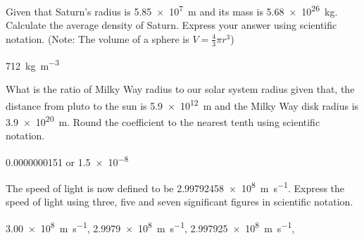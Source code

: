 \begin{question}[ID=SN13-Saturn,topic=units,difficulty=easy]
    Given that Saturn's radius is \SI{5.85e7}{\meter} and
        its mass is \SI{5.68e26}{\kilo\gram}.
    Calculate the average density of Saturn.
    Express your answer using scientific notation.
    (Note: The volume of a sphere is $V=\frac{4}{3} \pi{} r^3$)
\end{question}
\begin{solution}
    \SI{712}{\kilo\gram\per\meter\cubed}
\end{solution}


\begin{question}[ID=SN14-MilkyWay,topic=units,difficulty=easy]
    What is the ratio of Milky Way radius to our solar system radius given that,
        the distance from pluto to the sun is \SI{5.9e12}{\meter}
        and the Milky Way disk radius is \SI{3.9e20}{\meter}.
    Round the coefficient to the nearest tenth using scientific notation.
\end{question}
\begin{solution}
    \num{0.0000000151} or \num{1.5e-8}
\end{solution}


\begin{question}[ID=SN16-Light,topic=units,difficulty=easy]
    The speed of light is now defined to be
        \SI{2.99792458e8}{\meter\per\second}.
    Express the speed of light using three, five and seven
        significant figures in scientific notation.
\end{question}
\begin{solution}
    \SI{3.00e8}{\meter\per\second},
    \SI{2.9979e8}{\meter\per\second},
    \SI{2.997925e8}{\meter\per\second},
\end{solution}

\endinput


